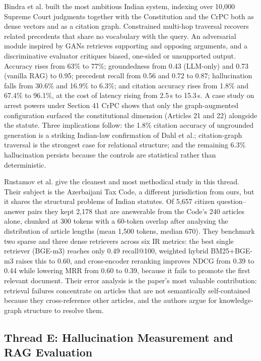 \documentclass[conference]{IEEEtran}
\begin{document}
Bindra et al. \cite{bindra2026} built the most ambitious Indian system, indexing over 10,000 Supreme Court judgments together with the Constitution and the CrPC both as dense vectors and as a citation graph. Constrained multi-hop traversal recovers related precedents that share no vocabulary with the query. An adversarial module inspired by GANs retrieves supporting and opposing arguments, and a discriminative evaluator critiques biased, one-sided or unsupported output. Accuracy rises from 63\% to 77\%; groundedness from 0.43 (LLM-only) and 0.73 (vanilla RAG) to 0.95; precedent recall from 0.56 and 0.72 to 0.87; hallucination falls from 30.6\% and 16.9\% to 6.3\%; and citation accuracy rises from 1.8\% and 67.4\% to 96.1\%, at the cost of latency rising from 2.5\,s to 15.3\,s. A case study on arrest powers under Section 41 CrPC shows that only the graph-augmented configuration surfaced the constitutional dimension (Articles 21 and 22) alongside the statute. Three implications follow: the 1.8\% citation accuracy of ungrounded generation is a striking Indian-law confirmation of Dahl et al.; citation-graph traversal is the strongest case for relational structure; and the remaining 6.3\% hallucination persists because the controls are statistical rather than deterministic.

Rustamov et al. \cite{rustamov2025} give the cleanest and most methodical study in this thread. Their subject is the Azerbaijani Tax Code, a different jurisdiction from ours, but it shares the structural problems of Indian statutes. Of 5,657 citizen question--answer pairs they kept 2,178 that are answerable from the Code's 240 articles alone, chunked at 300 tokens with a 60-token overlap after analysing the distribution of article lengths (mean 1,500 tokens, median 670). They benchmark two sparse and three dense retrievers across six IR metrics: the best single retriever (BGE-m3) reaches only 0.49 recall@100, weighted hybrid BM25+BGE-m3 raises this to 0.60, and cross-encoder reranking improves NDCG from 0.39 to 0.44 while lowering MRR from 0.60 to 0.39, because it fails to promote the first relevant document. Their error analysis is the paper's most valuable contribution: retrieval failures concentrate on articles that are not semantically self-contained because they cross-reference other articles, and the authors argue for knowledge-graph structure to resolve them.

\subsection{Thread E: Hallucination Measurement and RAG Evaluation}
\end{document}
